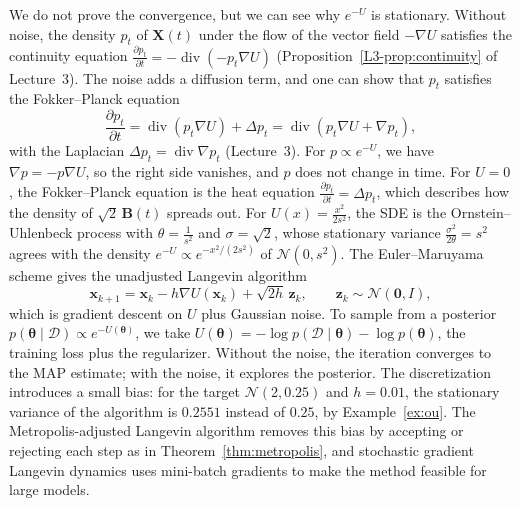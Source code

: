 \documentclass[11pt]{article}
\theoremstyle{definition}
\theoremstyle{plain}
\theoremstyle{remark}
\DeclareMathOperator{\Div}{div}
\begin{document}
We do not prove the convergence, but we can see why $e^{-U}$ is stationary. Without noise, the density $p_t$ of $\mathbf{X}(t)$ under the flow of the vector field $-\nabla U$ satisfies the continuity equation $\frac{\partial p_t}{\partial t} = -\Div(-p_t\nabla U)$ (Proposition~\ref{L3-prop:continuity} of Lecture~3). The noise adds a diffusion term, and one can show that $p_t$ satisfies the Fokker--Planck equation
\[\frac{\partial p_t}{\partial t} = \Div(p_t\nabla U) + \Delta p_t = \Div(p_t\nabla U + \nabla p_t),\]
with the Laplacian $\Delta p_t = \Div\nabla p_t$ (Lecture~3). For $p \propto e^{-U}$, we have $\nabla p = -p\nabla U$, so the right side vanishes, and $p$ does not change in time. For $U = 0$, the Fokker--Planck equation is the heat equation $\frac{\partial p_t}{\partial t} = \Delta p_t$, which describes how the density of $\sqrt{2}\,\mathbf{B}(t)$ spreads out. For $U(x) = \frac{x^2}{2s^2}$, the SDE is the Ornstein--Uhlenbeck process with $\theta = \frac{1}{s^2}$ and $\sigma = \sqrt{2}$, whose stationary variance $\frac{\sigma^2}{2\theta} = s^2$ agrees with the density $e^{-U} \propto e^{-x^2/(2s^2)}$ of $\mathcal{N}(0, s^2)$. The Euler--Maruyama scheme gives the unadjusted Langevin algorithm
\[\mathbf{x}_{k+1} = \mathbf{x}_k - h\nabla U(\mathbf{x}_k) + \sqrt{2h}\,\mathbf{z}_k, \qquad \mathbf{z}_k \sim \mathcal{N}(\mathbf{0}, I),\]
which is gradient descent on $U$ plus Gaussian noise. To sample from a posterior $p(\boldsymbol{\theta} \mid \mathcal{D}) \propto e^{-U(\boldsymbol{\theta})}$, we take $U(\boldsymbol{\theta}) = -\log p(\mathcal{D} \mid \boldsymbol{\theta}) - \log p(\boldsymbol{\theta})$, the training loss plus the regularizer. Without the noise, the iteration converges to the MAP estimate; with the noise, it explores the posterior. The discretization introduces a small bias: for the target $\mathcal{N}(2, 0.25)$ and $h = 0.01$, the stationary variance of the algorithm is $0.2551$ instead of $0.25$, by Example~\ref{ex:ou}. The Metropolis-adjusted Langevin algorithm removes this bias by accepting or rejecting each step as in Theorem~\ref{thm:metropolis}, and stochastic gradient Langevin dynamics uses mini-batch gradients to make the method feasible for large models.
\end{document}
